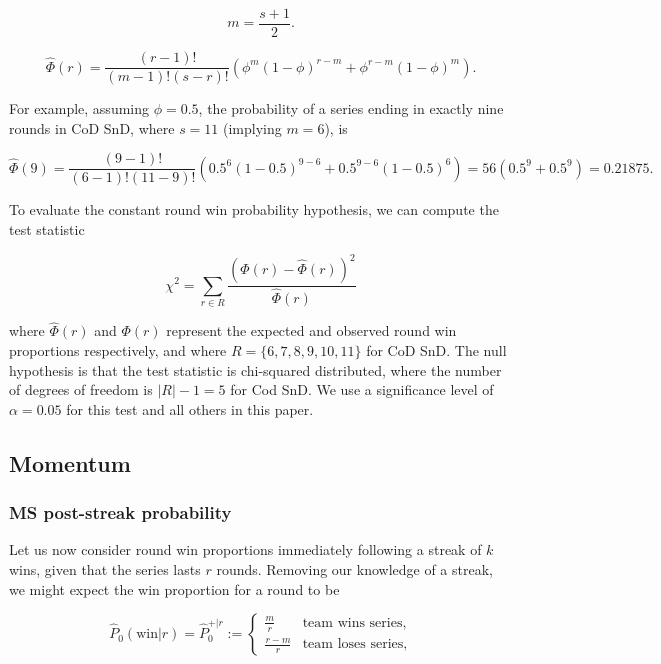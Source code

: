 \documentclass{article}
\begin{document}
\begin{equation}\label{eq:m}
m = \frac{s + 1}{2}.
\end{equation}

\begin{equation}\label{eq:series-length}
\hat{\Phi}(r) = \frac{(r - 1)!}{(m - 1)!(s - r)!}(\phi^{m}(1 - \phi)^{r - m} + \phi^{r - m}(1 - \phi)^m).
\end{equation}

For example, assuming \(\phi = 0.5\), the probability of a series ending
in exactly nine rounds in CoD SnD, where \(s=11\) (implying \(m=6\)), is

\[
\hat{\Phi}(9) = \frac{(9 - 1)!}{(6 - 1)!(11 - 9)!}(0.5^{6}(1 - 0.5)^{9 - 6} + 0.5^{9 - 6}(1 - 0.5)^6) = 56 (0.5^9 + 0.5^9) = 0.21875.
\]

To evaluate the constant round win probability hypothesis, we can
compute the test statistic

\begin{equation}\label{eq:chi-squ}
\chi^2 = \sum_{r \in R} \frac{(\Phi(r) - \hat{\Phi}(r))^2}{\hat{\Phi}(r)}
\end{equation}

where \(\hat{\Phi}(r)\) and \(\Phi(r)\) represent the expected and
observed round win proportions respectively, and where
\(R = \{6, 7, 8, 9, 10, 11\}\) for CoD SnD. The null hypothesis is that
the test statistic is chi-squared distributed, where the number of
degrees of freedom is \(\vert R \vert -1 = 5\) for Cod SnD. We use a
significance level of \(\alpha = 0.05\) for this test and all others in
this paper.

\hypertarget{momentum}{%
\subsection{Momentum}\label{momentum}}

\hypertarget{ms-post-streak-probability}{%
\subsubsection{MS post-streak
probability}\label{ms-post-streak-probability}}

Let us now consider round win proportions immediately following a streak
of \(k\) wins, given that the series lasts \(r\) rounds. Removing our
knowledge of a streak, we might expect the win proportion for a round to
be

\begin{equation}\label{eq:pwr}
\hat{P}_0(\text{win} | r) = \hat{P}^{+|r}_0 := \begin{cases} 
\frac{m}{r} & \text{team wins series}, \\ 
\frac{r - m}{r} & \text{team loses series},
\end{cases}
\end{equation}
\end{document}
